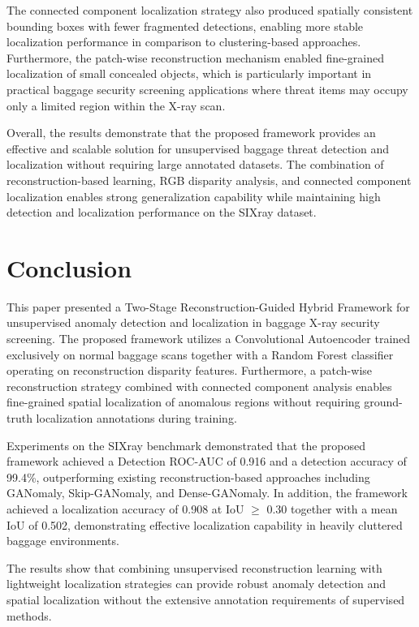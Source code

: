 \documentclass{bmvc2k}
\begin{document}
The connected component localization strategy also produced spatially consistent bounding boxes with fewer fragmented detections, enabling more stable localization performance in comparison to clustering-based approaches. Furthermore, the patch-wise reconstruction mechanism enabled fine-grained localization of small concealed objects, which is particularly important in practical baggage security screening applications where threat items may occupy only a limited region within the X-ray scan.

Overall, the results demonstrate that the proposed framework provides an effective and scalable solution for unsupervised baggage threat detection and localization without requiring large annotated datasets. The combination of reconstruction-based learning, RGB disparity analysis, and connected component localization enables strong generalization capability while maintaining high detection and localization performance on the SIXray dataset.

\section{Conclusion}
\label{sec:conclusion}

This paper presented a Two-Stage Reconstruction-Guided Hybrid Framework for unsupervised anomaly detection and localization in baggage X-ray security screening. The proposed framework utilizes a Convolutional Autoencoder trained exclusively on normal baggage scans together with a Random Forest classifier operating on reconstruction disparity features. Furthermore, a patch-wise reconstruction strategy combined with connected component analysis enables fine-grained spatial localization of anomalous regions without requiring ground-truth localization annotations during training.

Experiments on the SIXray benchmark demonstrated that the proposed framework achieved a Detection ROC-AUC of 0.916 and a detection accuracy of 99.4\%, outperforming existing reconstruction-based approaches including GANomaly, Skip-GANomaly, and Dense-GANomaly. In addition, the framework achieved a localization accuracy of 0.908 at IoU $\geq$ 0.30 together with a mean IoU of 0.502, demonstrating effective localization capability in heavily cluttered baggage environments.

The results show that combining unsupervised reconstruction learning with lightweight localization strategies can provide robust anomaly detection and spatial localization without the extensive annotation requirements of supervised methods. 


\end{document}
